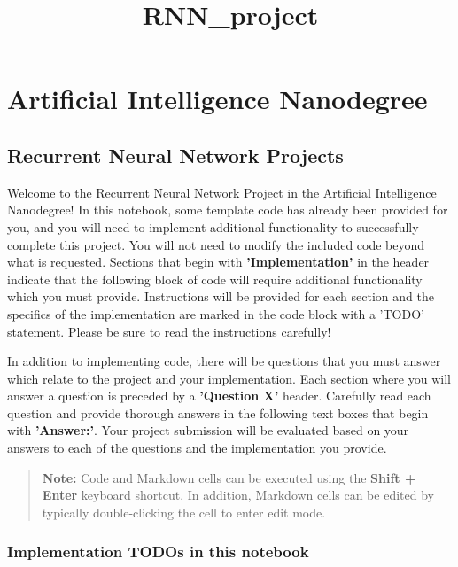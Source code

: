 \documentclass[11pt]{article}
\title{RNN\_project}
\begin{document}
    
    
    \maketitle
    
    

    
    \section{Artificial Intelligence
Nanodegree}\label{artificial-intelligence-nanodegree}

\subsection{Recurrent Neural Network
Projects}\label{recurrent-neural-network-projects}

Welcome to the Recurrent Neural Network Project in the Artificial
Intelligence Nanodegree! In this notebook, some template code has
already been provided for you, and you will need to implement additional
functionality to successfully complete this project. You will not need
to modify the included code beyond what is requested. Sections that
begin with \textbf{'Implementation'} in the header indicate that the
following block of code will require additional functionality which you
must provide. Instructions will be provided for each section and the
specifics of the implementation are marked in the code block with a
'TODO' statement. Please be sure to read the instructions carefully!

In addition to implementing code, there will be questions that you must
answer which relate to the project and your implementation. Each section
where you will answer a question is preceded by a \textbf{'Question X'}
header. Carefully read each question and provide thorough answers in the
following text boxes that begin with \textbf{'Answer:'}. Your project
submission will be evaluated based on your answers to each of the
questions and the implementation you provide.

\begin{quote}
\textbf{Note:} Code and Markdown cells can be executed using the
\textbf{Shift + Enter} keyboard shortcut. In addition, Markdown cells
can be edited by typically double-clicking the cell to enter edit mode.
\end{quote}

    \subsubsection{Implementation TODOs in this
notebook}\label{implementation-todos-in-this-notebook}
\end{document}
